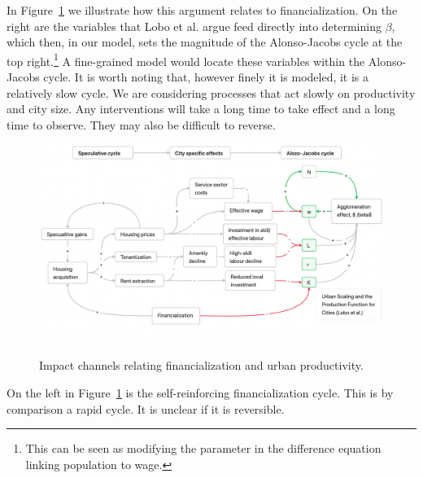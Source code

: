 In Figure~\ref{fig-impact-channels} we illustrate how this argument relates to financialization. On the right are the variables that Lobo et al. \cite{loboUrbanScalingProduction2013} argue feed directly into determining $\beta$, which then, in our model, sets the magnitude of the \gls{Alonso-Jacobs cycle} at the top right.\footnote{This can be seen as modifying the parameter in the difference equation linking population to wage.} A fine-grained model would locate these variables within the Alonso-Jacobs cycle. It is worth noting that, however finely it is modeled, it is a relatively slow cycle. We are considering processes that act slowly on productivity and city size. Any interventions will take a long time to take effect and a long time to observe. They may also be difficult to reverse. 

{\newpage\thispagestyle{empty}
\vspace{-1.5cm}
\begin{figure}[h!tb]
\vspace{-1cm}
\begin{adjustwidth}{-0.24\textwidth}{-0.24\textwidth}
\centering
\includegraphics[scale=.35, angle=90]{fig/impact-channels.png}
\label{fig-impact-channels}
\end{adjustwidth}
\caption{Impact channels relating financialization and urban productivity.}
\end{figure}
}
 
On the left in Figure~\ref{fig-impact-channels} is the self-reinforcing %
financialization cycle. This is by comparison a rapid cycle. It is unclear if it is reversible. 
 
